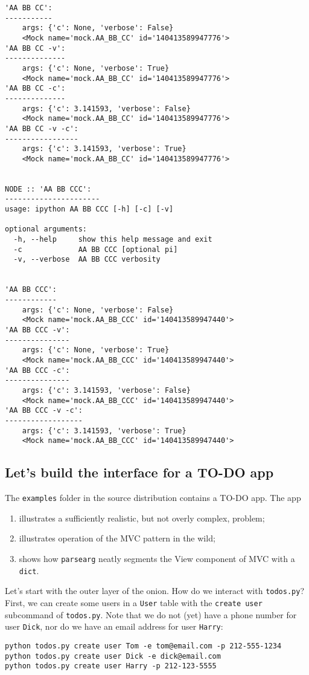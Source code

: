 \documentclass[10pt]{amsart}
\numberwithin{equation}{section}
\begin{document}
\begin{verbatim}
'AA BB CC':
-----------
	args: {'c': None, 'verbose': False}
	<Mock name='mock.AA_BB_CC' id='140413589947776'>
'AA BB CC -v':
--------------
	args: {'c': None, 'verbose': True}
	<Mock name='mock.AA_BB_CC' id='140413589947776'>
'AA BB CC -c':
--------------
	args: {'c': 3.141593, 'verbose': False}
	<Mock name='mock.AA_BB_CC' id='140413589947776'>
'AA BB CC -v -c':
-----------------
	args: {'c': 3.141593, 'verbose': True}
	<Mock name='mock.AA_BB_CC' id='140413589947776'>


NODE :: 'AA BB CCC':
----------------------
usage: ipython AA BB CCC [-h] [-c] [-v]

optional arguments:
  -h, --help     show this help message and exit
  -c             AA BB CCC [optional pi]
  -v, --verbose  AA BB CCC verbosity


'AA BB CCC':
------------
	args: {'c': None, 'verbose': False}
	<Mock name='mock.AA_BB_CCC' id='140413589947440'>
'AA BB CCC -v':
---------------
	args: {'c': None, 'verbose': True}
	<Mock name='mock.AA_BB_CCC' id='140413589947440'>
'AA BB CCC -c':
---------------
	args: {'c': 3.141593, 'verbose': False}
	<Mock name='mock.AA_BB_CCC' id='140413589947440'>
'AA BB CCC -v -c':
------------------
	args: {'c': 3.141593, 'verbose': True}
	<Mock name='mock.AA_BB_CCC' id='140413589947440'>
\end{verbatim}

\newpage
\subsection{Let's build the interface for a TO-DO app}
\label{sec:orgd3e90b7}
The \texttt{examples} folder in the source distribution contains a TO-DO app.
The app

\begin{enumerate}
\item illustrates a sufficiently realistic, but not overly complex, problem;
\item illustrates operation of the MVC pattern in the wild;
\item shows how \texttt{parsearg} neatly segments the View component of MVC with a \texttt{dict}.
\end{enumerate}

Let's start with the outer layer of the onion. How do we interact with
\texttt{todos.py}?  First, we can create some users in a \texttt{User} table with the 
\texttt{create user} subcommand of \texttt{todos.py}.  Note that we do not (yet) have a phone
number for user \texttt{Dick}, nor do we have an email address for user \texttt{Harry}:
\begin{verbatim}
python todos.py create user Tom -e tom@email.com -p 212-555-1234
python todos.py create user Dick -e dick@email.com
python todos.py create user Harry -p 212-123-5555
\end{verbatim}
\end{document}

